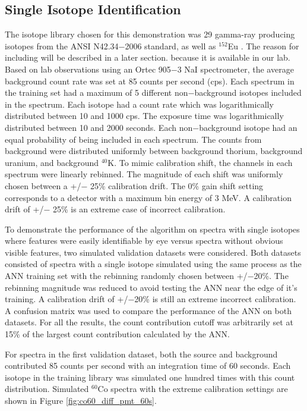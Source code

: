 \documentclass[tocnosub,noragright,centerchapter,12pt,fullpage]{uiucecethesis09}
\begin{document}
\subsection{Single Isotope Identification}

The isotope library chosen for this demonstration was 29 gamma-ray producing isotopes from the ANSI N42.34$-$2006 standard, as well as $^{152}$Eu \cite{ANSI}. The reason for including will be described in a later section. because it is available in our lab. Based on lab observations using an Ortec 905$-$3 NaI spectrometer, the average background count rate was set at 85 counts per second (cps). Each spectrum in the training set had a maximum of 5 different non$-$background isotopes included in the spectrum. Each isotope had a count rate which was logarithmically distributed between 10 and 1000 cps. The exposure time was logarithmically distributed between 10 and 2000 seconds. Each non$-$background isotope had an equal probability of being included in each spectrum. The counts from background were distributed uniformly between background thorium, background uranium, and background $^{40}$K. To mimic calibration shift, the channels in each spectrum were linearly rebinned. The magnitude of each shift was uniformly chosen between a +/$-$ 25\% calibration drift. The 0\% gain shift setting corresponds to a detector with a maximum bin energy of 3 MeV. A calibration drift of +/$-$ 25\% is an extreme case of incorrect calibration.

To demonstrate the performance of the algorithm on spectra with single isotopes where features were easily identifiable by eye versus spectra without obvious visible features, two simulated validation datasets were considered. Both datasets consisted of spectra with a single isotope simulated using the same process as the ANN training set with the rebinning randomly chosen between +/$-$20\%. The rebinning magnitude was reduced to avoid testing the ANN near the edge of it's training. A calibration drift of +/$-$20\% is still an extreme incorrect calibration. A confusion matrix was used to compare the performance of the ANN on both datasets. For all the results, the count contribution cutoff was arbitrarily set at 15\% of the largest count contribution calculated by the ANN.


For spectra in the first validation dataset, both the source and background contributed 85 counts per second with an integration time of 60 seconds. Each isotope in the training library was simulated one hundred times with this count distribution. Simulated $^{60}$Co spectra with the extreme calibration settings are shown in Figure \ref{fig:co60_diff_pmt_60s}.
\end{document}
